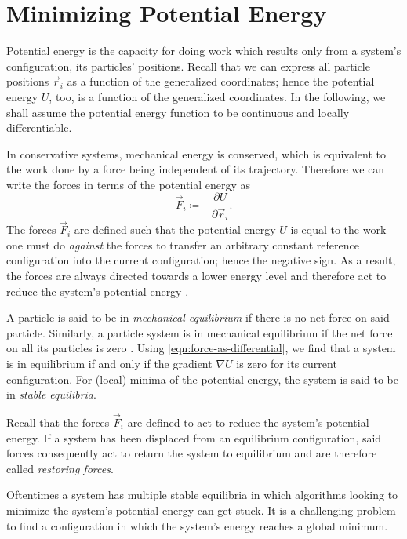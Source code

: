 \chapter{Minimizing Potential Energy}
\label{chap:minimizing-potential-energy}

Potential energy is the capacity for doing work which results only from a system's configuration, \ie{} its particles' positions. Recall that we can express all particle positions ${\vec{r}_i}$ as a function of the generalized coordinates; hence the potential energy ${U}$, too, is a function of the generalized coordinates. In the following, we shall assume the potential energy function to be continuous and locally differentiable.

In conservative systems, mechanical energy is conserved, which is equivalent to the work done by a force being independent of its trajectory. Therefore we can write the forces in terms of the potential energy as
%
\begin{equation}
  \vec{F}_i \coloneqq -\frac{\partial U}{\partial \vec{r}_i}.
  \label{eqn:force-as-differential}
\end{equation}
%
The forces ${\vec{F}_i}$ are defined such that the potential energy ${U}$ is equal to the work one must do \emph{against} the forces to transfer an arbitrary constant reference configuration into the current configuration; hence the negative sign. As a result, the forces are always directed towards a lower energy level and therefore act to reduce the system's potential energy \cite{Nave}.

\hfill

\noindent
A particle is said to be in \emph{mechanical equilibrium} if there is no net force on said particle. Similarly, a particle system is in mechanical equilibrium if the net force on all its particles is zero \cite{Orear}. Using \cref{eqn:force-as-differential}, we find that a system is in equilibrium if and only if the gradient ${\nabla U}$ is zero for its current configuration. For (local) minima of the potential energy, the system is said to be in \emph{stable equilibria}.

Recall that the forces ${\vec{F}_i}$ are defined to act to reduce the system's potential energy. If a system has been displaced from an equilibrium configuration, said forces consequently act to return the system to equilibrium and are therefore called \emph{restoring forces}.

Oftentimes a system has multiple stable equilibria in which algorithms looking to minimize the system's potential energy can get stuck. It is a challenging problem to find a configuration in which the system's energy reaches a global minimum.





\clearpage


\clearpage

